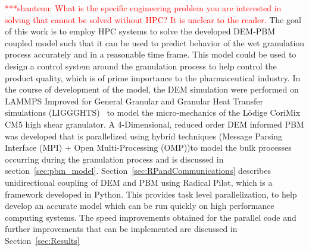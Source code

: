\documentclass[preprint,11pt,authoryear]{elsarticle}
\newcommand{\jhanote}[1]{ {\textcolor{red} { ***shantenu: #1 }}}
\newcommand{\jhanote}[1]{ {\textcolor{red} { ***shantenu: #1 }}}
\begin{document}



\jhanote{What is the specific engineering problem you are interested in
solving that cannot be solved without HPC? It is unclear to the reader.} 
The goal of this work is to employ HPC systems to solve the developed DEM-PBM coupled 
model such that it can be used to predict behavior of the wet granulation 
process accurately and in a reasonable time frame. 
This model could be used to design a control system 
around the granulation process to help control the product quality, which is of 
prime importance to the pharmaceutical industry. In the course of
development of the model, the DEM simulation were performed on LAMMPS Improved
for General Granular and Granular Heat Transfer simulations
(LIGGGHTS)~\citep{Kloss2012} to model the micro-mechanics of the L\"{o}dige
CoriMix CM5 high shear granulator. A 4-Dimensional, reduced order DEM informed
PBM was developed that is parallelized using hybrid techniques (Message
Parsing Interface (MPI) + Open Multi-Processing (OMP))to model the bulk
processes occurring during the granulation process and is discussed in
section~\ref{sec:pbm_model}. Section~\ref{sec:RPandCommunications} describes
unidirectional coupling of DEM and PBM using Radical Pilot, which is a
framework developed in Python. This provides task level parallelization, to
help develop an accurate model which can be run quickly on high performance
computing systems. The speed improvements obtained for the parallel code and
further improvements that can be implemented are discussed in
Section~\ref{sec:Results}
\end{document}
